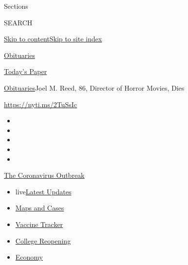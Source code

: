 Sections

SEARCH

\protect\hyperlink{site-content}{Skip to
content}\protect\hyperlink{site-index}{Skip to site index}

\href{https://www.nytimes.com/section/obituaries}{Obituaries}

\href{https://myaccount.nytimes.com/auth/login?response_type=cookie\&client_id=vi}{}

\href{https://www.nytimes.com/section/todayspaper}{Today's Paper}

\href{/section/obituaries}{Obituaries}\textbar{}Joel M. Reed, 86,
Director of Horror Movies, Dies

\url{https://nyti.ms/2TuSsIc}

\begin{itemize}
\item
\item
\item
\item
\item
\end{itemize}

\href{https://www.nytimes.com/news-event/coronavirus?action=click\&pgtype=Article\&state=default\&region=TOP_BANNER\&context=storylines_menu}{The
Coronavirus Outbreak}

\begin{itemize}
\tightlist
\item
  live\href{https://www.nytimes.com/2020/08/03/world/coronavirus-covid-19.html?action=click\&pgtype=Article\&state=default\&region=TOP_BANNER\&context=storylines_menu}{Latest
  Updates}
\item
  \href{https://www.nytimes.com/interactive/2020/us/coronavirus-us-cases.html?action=click\&pgtype=Article\&state=default\&region=TOP_BANNER\&context=storylines_menu}{Maps
  and Cases}
\item
  \href{https://www.nytimes.com/interactive/2020/science/coronavirus-vaccine-tracker.html?action=click\&pgtype=Article\&state=default\&region=TOP_BANNER\&context=storylines_menu}{Vaccine
  Tracker}
\item
  \href{https://www.nytimes.com/2020/08/02/us/covid-college-reopening.html?action=click\&pgtype=Article\&state=default\&region=TOP_BANNER\&context=storylines_menu}{College
  Reopening}
\item
  \href{https://www.nytimes.com/live/2020/08/03/business/stock-market-today-coronavirus?action=click\&pgtype=Article\&state=default\&region=TOP_BANNER\&context=storylines_menu}{Economy}
\end{itemize}

